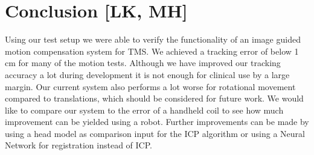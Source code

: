 \section{Conclusion [LK, MH]}

Using our test setup we were able to verify the functionality of an image guided motion compensation system for TMS. 
We achieved a tracking error of below 1 cm for many of the motion tests.
Although we have improved our tracking accuracy a lot during development it is not enough for clinical use by a large margin.
Our current system also performs a lot worse for rotational movement compared to translations, which should be considered for future work.
We would like to compare our system to the error of a handheld coil to see how much improvement can be yielded using a robot.
Further improvements can be made by using a head model as comparison input for the ICP algorithm or using a Neural Network for registration instead of ICP.

